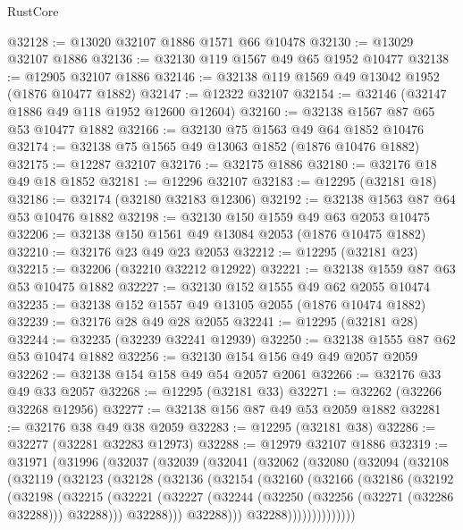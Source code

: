 \begin{lexlean}{RustCore}
\begin{coremodule}
@32128 := @13020 @32107 @1886 @1571 @66 @10478
@32130 := @13029 @32107 @1886
@32136 := @32130 @119 @1567 @49 @65 @1952 @10477
@32138 := @12905 @32107 @1886
@32146 := @32138 @119 @1569 @49 @13042 @1952 (@1876 @10477 @1882)
@32147 := @12322 @32107
@32154 := @32146 (@32147 @1886 @49 @118 @1952 @12600 @12604)
@32160 := @32138 @1567 @87 @65 @53 @10477 @1882
@32166 := @32130 @75 @1563 @49 @64 @1852 @10476
@32174 := @32138 @75 @1565 @49 @13063 @1852 (@1876 @10476 @1882)
@32175 := @12287 @32107
@32176 := @32175 @1886
@32180 := @32176 @18 @49 @18 @1852
@32181 := @12296 @32107
@32183 := @12295 (@32181 @18)
@32186 := @32174 (@32180 @32183 @12306)
@32192 := @32138 @1563 @87 @64 @53 @10476 @1882
@32198 := @32130 @150 @1559 @49 @63 @2053 @10475
@32206 := @32138 @150 @1561 @49 @13084 @2053 (@1876 @10475 @1882)
@32210 := @32176 @23 @49 @23 @2053
@32212 := @12295 (@32181 @23)
@32215 := @32206 (@32210 @32212 @12922)
@32221 := @32138 @1559 @87 @63 @53 @10475 @1882
@32227 := @32130 @152 @1555 @49 @62 @2055 @10474
@32235 := @32138 @152 @1557 @49 @13105 @2055 (@1876 @10474 @1882)
@32239 := @32176 @28 @49 @28 @2055
@32241 := @12295 (@32181 @28)
@32244 := @32235 (@32239 @32241 @12939)
@32250 := @32138 @1555 @87 @62 @53 @10474 @1882
@32256 := @32130 @154 @156 @49 @49 @2057 @2059
@32262 := @32138 @154 @158 @49 @54 @2057 @2061
@32266 := @32176 @33 @49 @33 @2057
@32268 := @12295 (@32181 @33)
@32271 := @32262 (@32266 @32268 @12956)
@32277 := @32138 @156 @87 @49 @53 @2059 @1882
@32281 := @32176 @38 @49 @38 @2059
@32283 := @12295 (@32181 @38)
@32286 := @32277 (@32281 @32283 @12973)
@32288 := @12979 @32107 @1886
@32319 := @31971
    (@31996
      (@32037
        (@32039
          (@32041
            (@32062
              (@32080
                (@32094
                  (@32108
                    (@32119
                      (@32123
                        (@32128
                          (@32136
                            (@32154
                              (@32160
                                (@32166
                                  (@32186
                                    (@32192
                                      (@32198
                                        (@32215
                                          (@32221
                                            (@32227
                                              (@32244
                                                (@32250 (@32256 (@32271 (@32286 @32288))) @32288)))
                                            @32288)))
                                      @32288)))
                                @32288))))))))))))))

\end{coremodule}
\end{lexlean}
